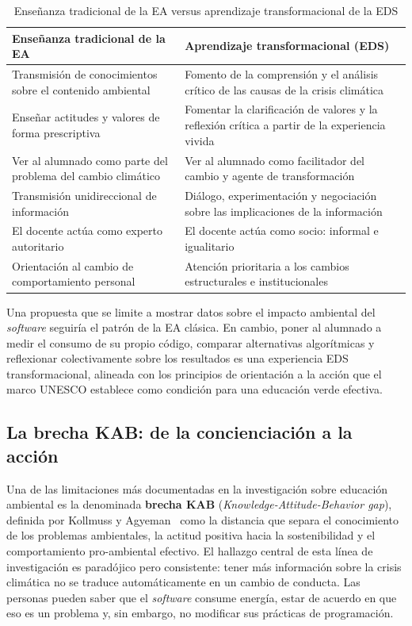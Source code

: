 \begin{table}[H]
\centering
\caption{Enseñanza tradicional de la EA versus aprendizaje transformacional de la EDS \cite{unesco2025guia}}
\label{tab:ea-vs-eds}

\begin{tabularx}{\textwidth}{|X|X|}
\hline
\textbf{Enseñanza tradicional de la EA} & \textbf{Aprendizaje transformacional (EDS)} \\
\hline
Transmisión de conocimientos sobre el contenido ambiental & Fomento de la comprensión y el análisis crítico de las causas de la crisis climática \\
\hline
Enseñar actitudes y valores de forma prescriptiva & Fomentar la clarificación de valores y la reflexión crítica a partir de la experiencia vivida \\
\hline
Ver al alumnado como parte del problema del cambio climático & Ver al alumnado como facilitador del cambio y agente de transformación \\
\hline
Transmisión unidireccional de información & Diálogo, experimentación y negociación sobre las implicaciones de la información \\
\hline
El docente actúa como experto autoritario & El docente actúa como socio: informal e igualitario \\
\hline
Orientación al cambio de comportamiento personal & Atención prioritaria a los cambios estructurales e institucionales \\
\hline
\end{tabularx}

\end{table}


Una propuesta que se limite a mostrar datos sobre el impacto ambiental del \textit{software} seguiría el patrón de la EA clásica. En cambio, poner al alumnado a medir el consumo de su propio código, comparar alternativas algorítmicas y reflexionar colectivamente sobre los resultados es una experiencia EDS transformacional, alineada con los principios de orientación a la acción que el marco UNESCO establece como condición para una educación verde efectiva.


\subsection{La brecha KAB: de la concienciación a la acción}


Una de las limitaciones más documentadas en la investigación sobre educación ambiental es la denominada \textbf{brecha KAB} (\textit{Knowledge-Attitude-Behavior gap}), definida por Kollmuss y Agyeman~\cite{kollmuss2002mind} como la distancia que separa el conocimiento de los problemas ambientales, la actitud positiva hacia la sostenibilidad y el comportamiento pro-ambiental efectivo. El hallazgo central de esta línea de investigación es paradójico pero consistente: tener más información sobre la crisis climática no se traduce automáticamente en un cambio de conducta. Las personas pueden saber que el \textit{software} consume energía, estar de acuerdo en que eso es un problema y, sin embargo, no modificar sus prácticas de programación.


